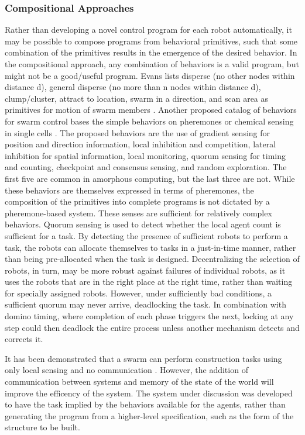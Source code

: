 \documentclass[]{article}
\begin{document}
\subsubsection{Compositional Approaches}

Rather than developing a novel control program for each robot automatically, it may be possible to compose programs from behavioral primitives, such that some combination of the primitives results in the emergence of the desired behavior. 
In the compositional approach, any combination of behaviors is a valid program, but might not be a good/useful program. 
Evans lists disperse (no other nodes within distance d), general disperse (no more than n nodes within distance d), clump/cluster, attract to location, swarm in a direction, and scan area as primitives for motion of swarm members \cite{evans2000programming}.
Another proposed catalog of behaviors for swarm control bases the simple behaviors on pheremones or chemical sensing in single cells \cite{nagpal2004catalog}. 
The proposed behaviors are the use of gradient sensing for position and direction information, local inhibition and competition, lateral inhibition for spatial information, local monitoring, quorum sensing for timing and counting, checkpoint and consensus sensing, and random exploration. 
The first five are common in amorphous computing, but the last three are not. %
While these behaviors are themselves expressed in terms of pheremones, the composition of the primitives into complete programs is not dictated by a pheremone-based system. 
These senses are sufficient for relatively complex behaviors. 
Quorum sensing is used to detect whether the local agent count is sufficient for a task. 
By detecting the presence of sufficient robots to perform a task, the robots can allocate themselves to tasks in a just-in-time manner, rather than being pre-allocated when the task is designed. 
Decentralizing the selection of robots, in turn, may be more robust against failures of individual robots, as it uses the robots that are in the right place at the right time, rather than waiting for specially assigned robots. 
However, under sufficiently bad conditions, a sufficient quorum may never arrive, deadlocking the task. 
In combination with domino timing, where completion of each phase triggers the next, locking at any step could then deadlock the entire process unless another mechanism detects and corrects it.

It has been demonstrated that a swarm can perform construction tasks using only local sensing and no communication \cite{wawerla2002collective, bowyer2000automated}.
However, the addition of communication between systems and memory of the state of the world will improve the efficency of the system.
The system under discussion was developed to have the task implied by the behaviors available for the agents, rather than generating the program from a higher-level specification, such as the form of the structure to be built.
\end{document}

